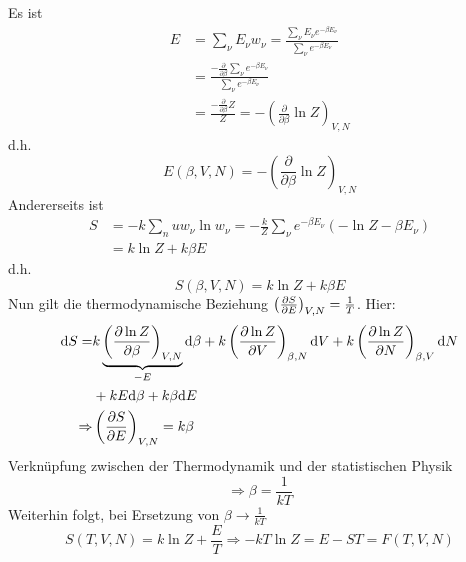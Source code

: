 \begin{enumerate}[A)]
    Es ist
    \begin{equation}
        \begin{split}
            E &= \sum_\nu E_\nu w_\nu = \frac{\sum_\nu E_\nu e^{-\beta E_\nu}}{\sum_\nu e^{-\beta E_\nu}}  \\
            &= \frac{-\frac{\partial}{\partial \beta} \sum_\nu e^{-\beta E_\nu}}{\sum_\nu e^{-\beta E_\nu}} \\
            &= \frac{-\frac{\partial}{\partial \beta} Z}{Z} = - \left( \frac{\partial}{\partial \beta} \ln Z \right)_{V, N}
        \end{split}
    \end{equation}
    d.h.
    \begin{equation}
        E(\beta, V, N) = - \left( \frac{\partial}{\partial \beta} \ln Z \right)_{V, N}
    \end{equation}
    Andererseits ist
    \begin{equation}
        \begin{split}
            S &= - k \sum_nu w_\nu \ln w_\nu = - \frac{k}{Z} \sum_\nu e^{-\beta E_\nu} \left( - \ln Z - \beta E_\nu \right) \\
            &= k \ln Z + k \beta E
        \end{split}
    \end{equation}
    d.h.
    \begin{equation}
        S(\beta, V, N) = k \ln Z + k \beta E
    \end{equation}
    Nun gilt die thermodynamische Beziehung $\left( \frac{\partial S}{\partial E} \right)_{V, N} = \frac{1}{T}$. Hier:
    \begin{equation}
        \begin{split}
            \mathrm{d} S =& k \underbrace{\left( \frac{\partial \ln Z}{\partial \beta} \right)_{V, N}}_{-E} \mathrm{d} \beta + k \left( \frac{\partial \ln Z}{\partial V} \right)_{\beta, N} \mathrm{d} V + k \left( \frac{\partial \ln Z}{\partial N} \right)_{\beta, V} \mathrm{d} N \\
            & + k E \mathrm{d} \beta + k \beta \mathrm{d} E \\
            \Rightarrow & \left( \frac{\partial S}{\partial E} \right)_{V, N} = k \beta
        \end{split}
    \end{equation}
    Verknüpfung zwischen der Thermodynamik und der statistischen Physik
    \begin{equation}
        \Rightarrow \beta = \frac{1}{k T}
    \end{equation}
    Weiterhin folgt, bei Ersetzung von $\beta \to \frac{1}{kT}$
    \begin{equation}
        S(T, V, N) = k \ln Z  + \frac{E}{T} \Rightarrow - k T \ln Z = E - ST = F(T, V, N)

\end{equation}
\end{enumerate}
